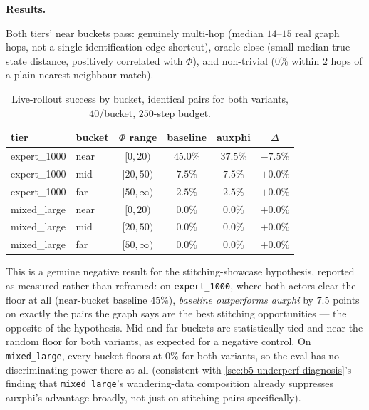 \documentclass[11pt]{article}
\begin{document}
\textbf{Results.}

\begin{table}[h]
\centering
\small
\caption{Safeguards 4/5: near-bucket validation against the independent true oracle and
hop-count/Euclidean controls.}
\end{table}

Both tiers' near buckets pass: genuinely multi-hop (median $14$--$15$ real graph hops, not a
single identification-edge shortcut), oracle-close (small median true state distance,
positively correlated with $\Phi$), and non-trivial ($0\%$ within $2$ hops of a plain
nearest-neighbour match).

\begin{table}[h]
\centering
\small
\caption{Live-rollout success by bucket, identical pairs for both variants, $40$/bucket,
$250$-step budget.}
\begin{tabular}{llcccc}
\toprule
tier & bucket & $\Phi$ range & baseline & \textbf{auxphi} & $\Delta$ \\
\midrule
expert\_1000 & near & $[0,20)$ & $\mathbf{45.0\%}$ & $37.5\%$ & $-7.5\%$ \\
expert\_1000 & mid  & $[20,50)$ & $7.5\%$ & $7.5\%$ & $+0.0\%$ \\
expert\_1000 & far  & $[50,\infty)$ & $2.5\%$ & $2.5\%$ & $+0.0\%$ \\
\midrule
mixed\_large & near & $[0,20)$ & $0.0\%$ & $0.0\%$ & $+0.0\%$ \\
mixed\_large & mid  & $[20,50)$ & $0.0\%$ & $0.0\%$ & $+0.0\%$ \\
mixed\_large & far  & $[50,\infty)$ & $0.0\%$ & $0.0\%$ & $+0.0\%$ \\
\bottomrule
\end{tabular}
\end{table}

This is a genuine negative result for the stitching-showcase hypothesis, reported as measured
rather than reframed: on \texttt{expert\_1000}, where both actors clear the floor at all
(near-bucket baseline $45\%$), \emph{baseline outperforms auxphi} by $7.5$ points on exactly the
pairs the graph says are the best stitching opportunities --- the opposite of the hypothesis.
Mid and far buckets are statistically tied and near the random floor for both variants, as
expected for a negative control. On \texttt{mixed\_large}, every bucket floors at $0\%$ for both
variants, so the eval has no discriminating power there at all (consistent with
\cref{sec:b5-underperf-diagnosis}'s finding that \texttt{mixed\_large}'s wandering-data
composition already suppresses auxphi's advantage broadly, not just on stitching pairs
specifically).
\end{document}
